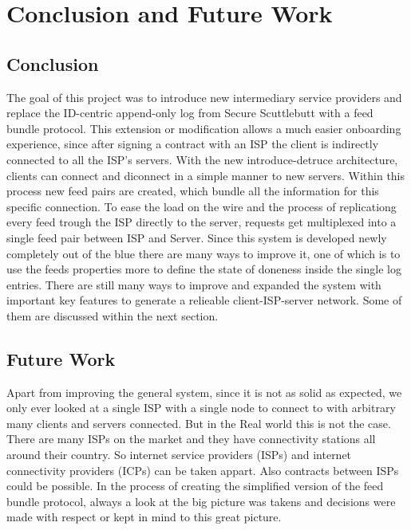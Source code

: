 \chapter{Conclusion and Future Work}
\section{Conclusion}
The goal of this project was to introduce new intermediary service providers and replace the ID-centric append-only log from Secure Scuttlebutt with a feed bundle protocol. This extension or modification allows a much easier onboarding experience, since after signing a contract with an ISP the client is indirectly connected to all the ISP's servers. With the new introduce-detruce architecture, clients can connect and diconnect in a simple manner to new servers. Within this process new feed pairs are created, which bundle all the information for this specific connection. To ease the load on the wire and the process of replicationg every feed trough the ISP directly to the server, requests get multiplexed into a single feed pair between ISP and Server.
Since this system is developed newly completely out of the blue there are many ways to improve it, one of which is to use the feeds properties more to define the state of doneness inside the single log entries. There are still many ways to improve and expanded the system with important key features to generate a relieable client-ISP-server network. Some of them are discussed within the next section.
\section{Future Work}
Apart from improving the general system, since it is not as solid as expected, we only ever looked at a single ISP with a single node to connect to with arbitrary many clients and servers connected. But in the Real world this is not the case. There are many ISPs on the market and they have connectivity stations all around their country. So internet service providers (ISPs) and internet connectivity providers (ICPs) can be taken appart. Also contracts between ISPs could be possible. In the process of creating the simplified version of the feed bundle protocol, always a look at the big picture was takens and decisions were made with respect or kept in mind to this great picture.


